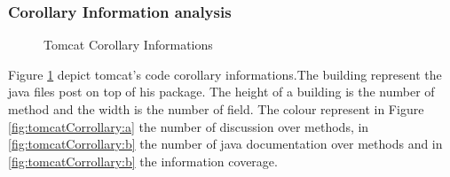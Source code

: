 \documentclass[]{usiinfbachelorproject}
\begin{document}
\subsubsection{Corollary Information analysis}
\begin{figure}[h]
\hspace*{\fill}


%

\caption{Tomcat Corollary Informations \label{fig:tomcatCorrollary}
}
\end{figure}
Figure \ref{fig:tomcatCorrollary} depict tomcat's code corollary  informations.The building represent the java files post on top of his package. The height of a building is the number of method and the width is the number of field. The colour represent in Figure \ref{fig:tomcatCorrollary:a} the number of discussion over methods, in \ref{fig:tomcatCorrollary:b} the number of java documentation over methods and  in \ref{fig:tomcatCorrollary:b} the information coverage.\\
\end{document}
